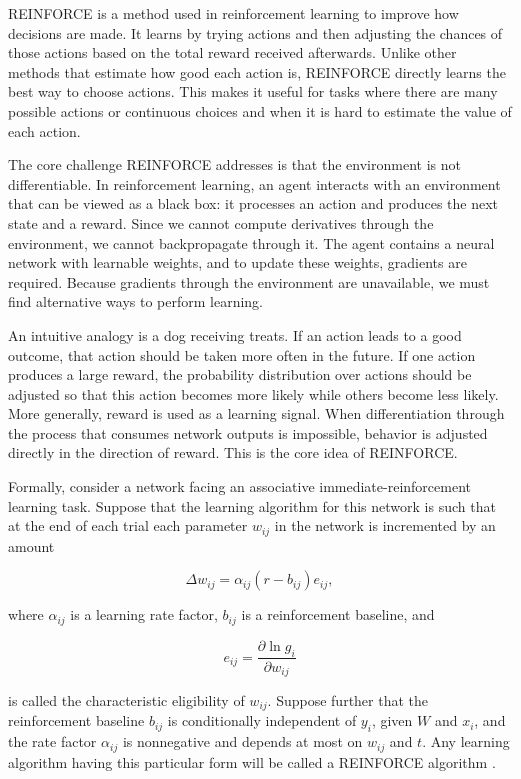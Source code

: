 REINFORCE is a method used in reinforcement learning to improve how decisions are made. It learns by trying actions and then adjusting the chances of those actions based on the total reward received afterwards. Unlike other methods that estimate how good each action is, REINFORCE directly learns the best way to choose actions. This makes it useful for tasks where there are many possible actions or continuous choices and when it is hard to estimate the value of each action.


The core challenge REINFORCE addresses is that the environment is not differentiable. In reinforcement learning, an agent interacts with an environment that can be viewed as a black box: it processes an action and produces the next state and a reward. Since we cannot compute derivatives through the environment, we cannot backpropagate through it. The agent contains a neural network with learnable weights, and to update these weights, gradients are required. Because gradients through the environment are unavailable, we must find alternative ways to perform learning.


An intuitive analogy is a dog receiving treats. If an action leads to a good outcome, that action should be taken more often in the future. If one action produces a large reward, the probability distribution over actions should be adjusted so that this action becomes more likely while others become less likely. More generally, reward is used as a learning signal. When differentiation through the process that consumes network outputs is impossible, behavior is adjusted directly in the direction of reward. This is the core idea of REINFORCE.


Formally, consider a network facing an associative immediate-reinforcement learning task. Suppose that the learning algorithm for this network is such that at the end of each trial each parameter $w_{ij}$ in the network is incremented by an amount

\[
\Delta w_{ij} = \alpha_{ij}(r - b_{ij}) e_{ij},
\]

where $\alpha_{ij}$ is a learning rate factor, $b_{ij}$ is a reinforcement baseline, and

\[
e_{ij} = \frac{\partial \ln g_i}{\partial w_{ij}}
\]

is called the characteristic eligibility of $w_{ij}$. Suppose further that the reinforcement baseline $b_{ij}$ is conditionally independent of $y_i$, given $W$ and $x_i$, and the rate factor $\alpha_{ij}$ is nonnegative and depends at most on $w_{ij}$ and $t$. Any learning algorithm having this particular form will be called a REINFORCE algorithm \cite{williamsSimpleStatisticalGradientfollowing1992}.


